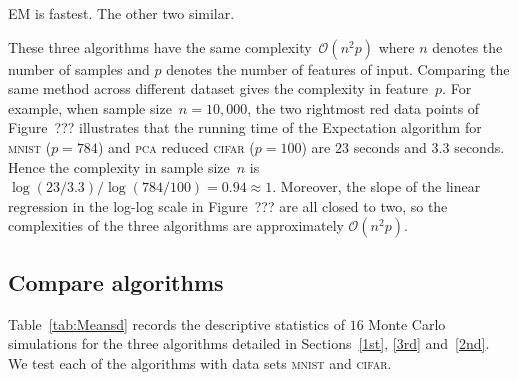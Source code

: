 \documentclass[12pt]{article} %
\begin{document}
EM is fastest. The other two similar.

These three algorithms have the same complexity~$\mathcal{O}(n^2p)$ where $n$ denotes the number of samples and $p$ denotes the number of features of input. Comparing the same method across different dataset gives the complexity in feature~$p$. For example, when sample size~$n=10,000$, the two rightmost red data points of Figure~??? illustrates that the running time of the Expectation  algorithm for \textsc{mnist} ($p=784$) and \textsc{pca} reduced \textsc{cifar} ($p=100$) are $23$ seconds and $3.3$ seconds. Hence the complexity in sample size~$n$ is 
\begin{math}
    \log(23/3.3)/\log(784/100)=0.94 \approx 1.
\end{math}
Moreover, the slope of the linear regression in the log-log scale in Figure~??? are all closed to two, so the complexities of the three algorithms are approximately $\mathcal{O}(n^2p)$. 

\subsection{Compare algorithms}

Table~\ref{tab:Meansd} records the descriptive statistics of $16$ Monte Carlo simulations for the three algorithms detailed in Sections~\ref{1st}, \ref{3rd} and~\ref{2nd}.  We test each of the algorithms with data sets \textsc{mnist} and \textsc{cifar}.
\end{document}
